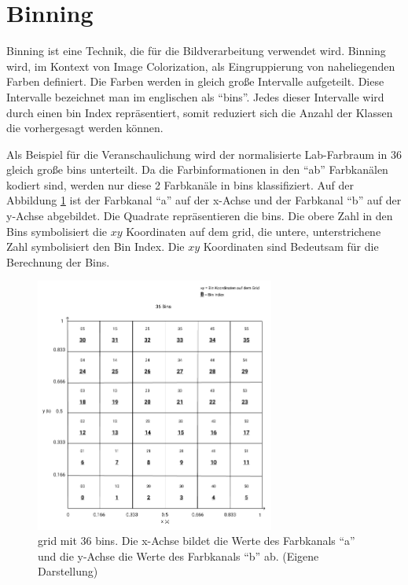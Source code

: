 \section{Binning}\label{section:binning}
Binning ist eine Technik, die für die Bildverarbeitung verwendet wird. Binning wird, im Kontext von Image Colorization, als Eingruppierung
von naheliegenden Farben definiert. Die Farben werden in gleich große Intervalle aufgeteilt. Diese Intervalle bezeichnet man im englischen als
``\gls{bin}s''. Jedes dieser Intervalle wird durch einen \gls{bin} Index repräsentiert, somit reduziert sich die Anzahl der Klassen die vorhergesagt werden
können.

Als Beispiel für die Veranschaulichung wird der normalisierte Lab-Farbraum in 36 gleich große \gls{bin}s unterteilt. Da die Farbinformationen
in den ``ab'' Farbkanälen kodiert sind, werden nur diese 2 Farbkanäle in \gls{bin}s klassifiziert. Auf der Abbildung \ref{image:bins} ist der Farbkanal
``a'' auf der x-Achse und der Farbkanal ``b'' auf der y-Achse abgebildet. Die Quadrate repräsentieren die \gls{bin}s. Die obere Zahl in den Bins
symbolisiert die $xy$ Koordinaten auf dem \gls{grid}, die untere, unterstrichene Zahl symbolisiert den Bin Index.
Die $xy$ Koordinaten sind Bedeutsam für die Berechnung der Bins.

\begin{figure}[H]
  \centering
  \includegraphics[width=0.7\textwidth]{resources/bins/bins.jpg}
  \caption{
    \gls{grid} mit 36 bins. Die x-Achse bildet die Werte des Farbkanals ``a'' und die y-Achse die Werte des Farbkanals ``b'' ab. (Eigene Darstellung)
  }
  \label{image:bins}
\end{figure}

